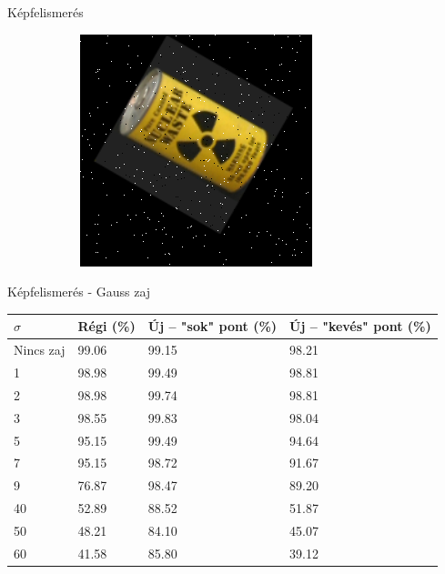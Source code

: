 \documentclass{beamer}
\begin{document}
\begin{frame}{Képfelismerés}
\begin{figure}[tbp]
\begin{subfigure}{0.25\textwidth}
    \includegraphics[width=\textwidth]{figures/noise/pepper1.png}
	\end{subfigure}
\end{figure}
\end{frame}

\begin{frame}{Képfelismerés - Gauss zaj}
    \vskip 1cm
    \begin{table}[tbp]
        \centering
        \begin{tabular}{|p{1.5cm}|p{1.5cm}|p{1.8cm}|p{2cm}|} \hline
            $\sigma$ & \textbf{Régi} (\%) & \textbf{Új} -- "sok" pont (\%)& \textbf{Új} -- "kevés" pont (\%) \\ \hline\hline
            Nincs zaj & 99.06 & 99.15 & 98.21 \\ \hline
            1 & 98.98 & 99.49 & 98.81 \\ \hline
            2 & 98.98 & 99.74 & 98.81 \\ \hline
            3 & 98.55 & 99.83 & 98.04 \\ \hline
            5 & 95.15 & 99.49 & 94.64 \\ \hline
            7 & 95.15 & 98.72 & 91.67 \\ \hline
            9 & 76.87 & 98.47 & 89.20 \\ \hline
            40 & 52.89 & 88.52 & 51.87 \\ \hline
            50 & 48.21 & 84.10 & 45.07 \\ \hline
            60 & 41.58 & 85.80 & 39.12 \\ \hline
        \end{tabular}
    \end{table}
\end{frame}
\end{document}
